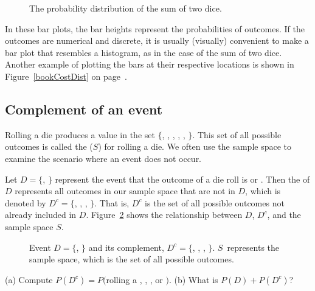 \begin{figure}
  \centering
  \caption{The probability distribution of the sum of two dice.}
  \label{diceSumDist}
\end{figure}

In these bar plots, the bar heights represent the probabilities of outcomes. If the outcomes are numerical and discrete, it is usually (visually) convenient to make a bar plot that resembles a histogram, as in the case of the sum of two dice. Another example of plotting the bars at their respective locations is shown in Figure~\ref{bookCostDist} on page~\pageref{bookCostDist}.

\subsection{Complement of an event}

Rolling a die produces a value in the set $\{$, , , , , $\}$. This set of all possible outcomes is called the  ($S$) for rolling a die. We often use the sample space to examine the scenario where an event does not occur.

Let $D=\{$, $\}$ represent the event that the outcome of a die roll is  or . Then the  of $D$ represents all outcomes in our sample space that are not in $D$, which is denoted by $D^c = \{$, , , $\}$. That is, $D^c$ is the set of all possible outcomes not already included in $D$. Figure~\ref{complementOfD} shows the relationship between $D$, $D^c$, and the sample space $S$. 

\begin{figure}[hht]
  \centering
  \caption{Event $D=\{$, $\}$ and its complement,
      $D^c = \{$, , , $\}$.
      $S$~represents the sample space, which is the set of
      all possible outcomes.}
  \label{complementOfD}
\end{figure}

\begin{exercisewrap}
\begin{nexercise}
(a) Compute $P(D^c) = P($rolling a , , , or $)$. (b) What is $P(D) + P(D^c)$?\footnotemark
\end{nexercise}
\end{exercisewrap}

